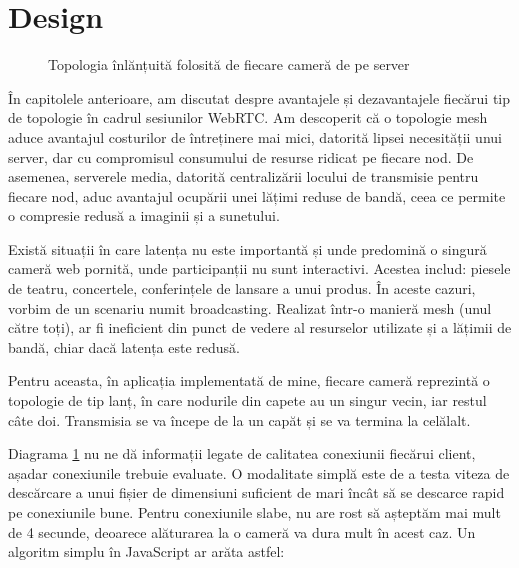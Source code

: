 \section{Design}
\label{chap:ch6sec2}
\begin{figure}[!htbp]
    \centering
    \scalebox{0.65}{}
    \caption{Topologia înlănțuită folosită de fiecare cameră de pe server}
    \label{AppTopology}
\end{figure}
\indent \par În capitolele anterioare, am discutat despre avantajele și dezavantajele fiecărui tip de topologie în cadrul sesiunilor WebRTC. Am descoperit că o topologie mesh aduce avantajul costurilor de întreținere mai mici, datorită lipsei necesității unui server, dar cu compromisul consumului de resurse ridicat pe fiecare nod. De asemenea, serverele media, datorită centralizării locului de transmisie pentru fiecare nod, aduc avantajul ocupării unei lățimi reduse de bandă, ceea ce permite o compresie redusă a imaginii și a sunetului.
\indent \par Există situații în care latența nu este importantă și unde predomină o singură cameră web pornită, unde participanții nu sunt interactivi. Acestea includ: piesele de teatru, concertele, conferințele de lansare a unui produs. În aceste cazuri, vorbim de un scenariu numit broadcasting. Realizat într-o manieră mesh (unul către toți), ar fi ineficient din punct de vedere al resurselor utilizate și a lățimii de bandă, chiar dacă latența este redusă.
\indent \par Pentru aceasta, în aplicația implementată de mine, fiecare cameră reprezintă o topologie de tip lanț, în care nodurile din capete au un singur vecin, iar restul câte doi. Transmisia se va începe de la un capăt și se va termina la celălalt.
\indent \par Diagrama \ref{AppTopology} nu ne dă informații legate de calitatea conexiunii fiecărui client, așadar conexiunile trebuie evaluate. O modalitate simplă este de a testa viteza de descărcare a unui fișier de dimensiuni suficient de mari încât să se descarce rapid pe conexiunile bune. Pentru conexiunile slabe, nu are rost să așteptăm mai mult de 4 secunde, deoarece alăturarea la o cameră va dura mult în acest caz. Un algoritm simplu în JavaScript ar arăta astfel:
